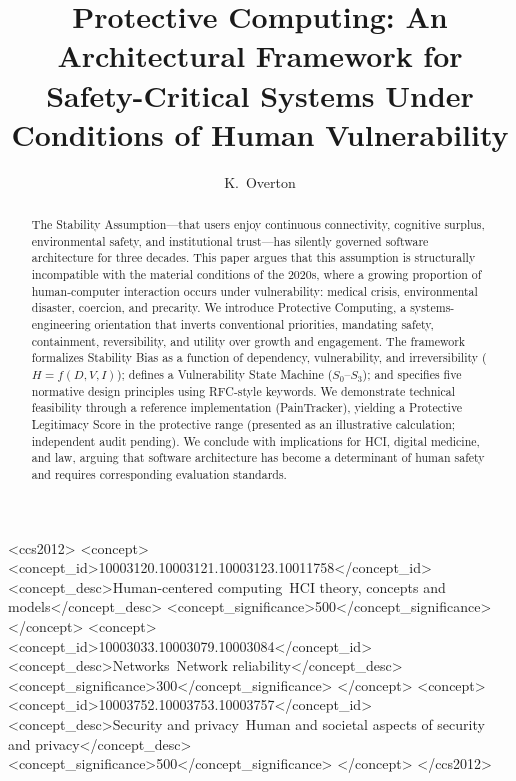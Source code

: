 \documentclass[acmsmall,review]{acmart}
\begin{document}
\title{Protective Computing: An Architectural Framework for Safety-Critical Systems Under Conditions of Human Vulnerability}

\author{K.\ Overton}

\begin{abstract}
The Stability Assumption---that users enjoy continuous connectivity, cognitive surplus, environmental safety, and institutional trust---has silently governed software architecture for three decades. This paper argues that this assumption is structurally incompatible with the material conditions of the 2020s, where a growing proportion of human-computer interaction occurs under vulnerability: medical crisis, environmental disaster, coercion, and precarity. We introduce Protective Computing, a systems-engineering orientation that inverts conventional priorities, mandating safety, containment, reversibility, and utility over growth and engagement. The framework formalizes Stability Bias as a function of dependency, vulnerability, and irreversibility ($H = f(D, V, I)$); defines a Vulnerability State Machine ($S_0$--$S_3$); and specifies five normative design principles using RFC-style keywords. We demonstrate technical feasibility through a reference implementation (PainTracker), yielding a Protective Legitimacy Score in the protective range (presented as an illustrative calculation; independent audit pending). We conclude with implications for HCI, digital medicine, and law, arguing that software architecture has become a determinant of human safety and requires corresponding evaluation standards.
\end{abstract}

\begin{CCSXML}
<ccs2012>
<concept>
<concept_id>10003120.10003121.10003123.10011758</concept_id>
<concept_desc>Human-centered computing~HCI theory, concepts and models</concept_desc>
<concept_significance>500</concept_significance>
</concept>
<concept>
<concept_id>10003033.10003079.10003084</concept_id>
<concept_desc>Networks~Network reliability</concept_desc>
<concept_significance>300</concept_significance>
</concept>
<concept>
<concept_id>10003752.10003753.10003757</concept_id>
<concept_desc>Security and privacy~Human and societal aspects of security and privacy</concept_desc>
<concept_significance>500</concept_significance>
</concept>
</ccs2012>
\end{CCSXML}
\end{document}
